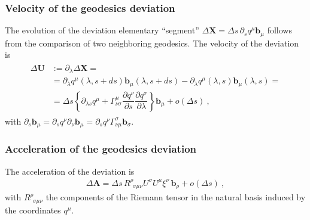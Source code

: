 \documentclass[letterpaper,10pt,english]{jupyterBook}
\begin{document}
\subsubsection{Velocity of the geodesics deviation}
\label{\detokenize{ch/relativity-general/geodesics:velocity-of-the-geodesics-deviation}}\label{\detokenize{ch/relativity-general/geodesics:general-relativity-geodesics-deviation-velocity}}
\sphinxAtStartPar
The evolution of the deviation elementary “segment” \(\Delta \mathbf{X} = \Delta s \, \partial_s q^{\mu} \mathbf{b}_{\mu}\) follows from the comparison of two neighboring geodesics. The velocity of the deviation is
\begin{equation*}
\begin{split}\begin{aligned}
  \Delta \mathbf{U} 
  & := \partial_\lambda \Delta \mathbf{X} = \\
  & = \partial_\lambda q^{\mu}(\lambda,s+ds) \mathbf{b}_{\mu}(\lambda,s+ds) - \partial_\lambda q^{\mu}(\lambda,s) \mathbf{b}_{\mu}(\lambda,s) = \\
  & = \Delta s \left\{ \partial_{\lambda s} q^{\mu} + \Gamma^{\mu}_{\nu \sigma} \dfrac{\partial q^{\nu}}{\partial s} \dfrac{\partial q^{\sigma}}{\partial \lambda} \right\} \mathbf{b}_{\mu} + o\left(\Delta s\right) \ ,
\end{aligned}\end{split}
\end{equation*}
\sphinxAtStartPar
with \(\partial_s \mathbf{b}_{\mu} = \partial_s q^{\nu} \partial_{\nu} \mathbf{b}_{\mu} = \partial_s q^{\nu} \Gamma^{\sigma}_{\nu \mu} \mathbf{b}_{\sigma}\).


\subsubsection{Acceleration of the geodesics deviation}
\label{\detokenize{ch/relativity-general/geodesics:acceleration-of-the-geodesics-deviation}}\label{\detokenize{ch/relativity-general/geodesics:general-relativity-geodesics-deviation-acceleration}}
\sphinxAtStartPar
The acceleration of the deviation is
\begin{equation*}
\begin{split}\Delta \mathbf{A} = \Delta s \, R^{\rho}_{\ \ \sigma \mu \nu} U^{\sigma} U^{\mu} \xi^{\nu} \, \mathbf{b}_{\rho} + o(\Delta s) \ ,\end{split}
\end{equation*}
\sphinxAtStartPar
with \(R^{\rho}_{\ \ \sigma \mu \nu}\) the components of the Riemann tensor in the natural basis induced by the coordinates \(q^{\mu}\).
\end{document}
